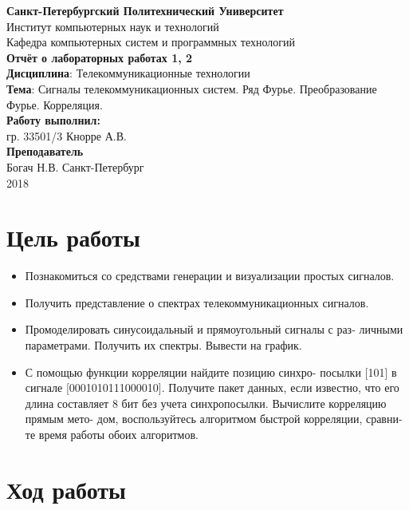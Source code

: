 \documentclass[a4paper,14pt]{extarticle}
\begin{document}
\begin{titlepage}
\centering 
{\bfseries Санкт-Петербургский Политехнический Университет} \\
Институт компьютерных наук и технологий \\
Кафедра компьютерных систем и программных технологий \\
\vspace{5cm}
{\centering \textbf{Отчёт о лабораторных работах 1, 2} \\ 
\vspace{0.2cm}
\textbf{Дисциплина}: Телекоммуникационные технологии \\
\vspace{0.2cm}
\textbf{Тема}: Сигналы телекоммуникационных систем. Ряд Фурье. Преобразование
Фурье. Корреляция.} \\
\vspace{4cm}
\hfill {\bfseries Работу выполнил:}  \\
\hfill гр. 33501/3 Кнорре А.В. \\
\hfill {\bfseries Преподаватель}  \\
\hfill Богач Н.В.
\vfill
Санкт-Петербург \\
{\large 2018}
\end{titlepage}

\section{Цель работы}
\begin{itemize}
\item Познакомиться со средствами генерации и визуализации простых сигналов. 

\item Получить представление о спектрах телекоммуникационных сигналов.

\item Промоделировать синусоидальный и прямоугольный сигналы с раз-
личными параметрами. Получить их спектры. Вывести на график.

\item С помощью функции корреляции найдите позицию синхро-
посылки [101] в сигнале [0001010111000010]. Получите пакет
данных, если известно, что его длина составляет 8 бит без
учета синхропосылки. Вычислите корреляцию прямым мето-
дом, воспользуйтесь алгоритмом быстрой корреляции, сравни-
те время работы обоих алгоритмов.
\end{itemize}

\section{Ход работы}
\end{document}

